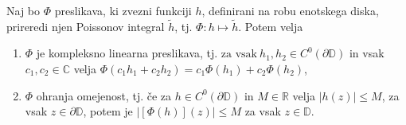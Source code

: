 \documentclass[mat1, tisk]{fmfdelo}
\begin{document}
    \begin{trditev}
       \label{lastpi}
       Naj bo $\Phi$ preslikava, ki zvezni funkciji $h$, definirani na robu enotskega diska, prireredi njen Poissonov integral $\widetilde{h}$, tj. $\Phi : h \mapsto \widetilde{h}$.
       Potem velja
       \begin{enumerate}[label={\alph*)}]
           \item $\Phi$ je kompleksno linearna preslikava, tj. $\text{za vsak}~h_1,h_2 \in C^0(\partial \mathbb{D})$ in vsak $c_1,c_2 \in \mathbb{C}$ velja $\Phi(c_1 h_1 + c_2 h_2) = c_1 \Phi(h_1) + c_2 \Phi(h_2)$,
           \item $\Phi$ ohranja omejenost, tj. če za $h \in C^0(\partial \mathbb{D})$ in $M \in \mathbb{R}$ velja $|h(z)| \leq M$, za vsak $z \in \partial \mathbb{D}$, potem je $|[\Phi(h)](z)| \leq M$ za vsak $z \in \mathbb{D}$.
       \end{enumerate}
    \end{trditev}
\end{document}
